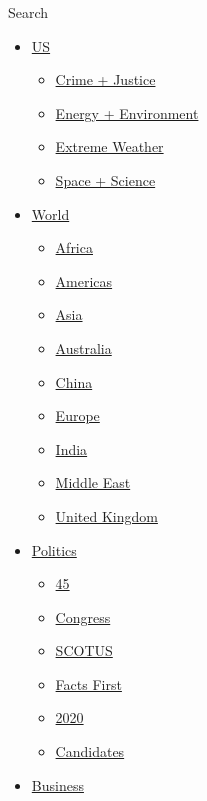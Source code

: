Search

\begin{itemize}
\tightlist
\item
  \href{/us}{US}

  \begin{itemize}
  \tightlist
  \item
    \href{/specials/us/crime-and-justice}{Crime + Justice}
  \item
    \href{/specials/us/energy-and-environment}{Energy + Environment}
  \item
    \href{/specials/us/extreme-weather}{Extreme Weather}
  \item
    \href{/specials/space-science}{Space + Science}
  \end{itemize}
\item
  \href{/world}{World}

  \begin{itemize}
  \tightlist
  \item
    \href{/africa}{Africa}
  \item
    \href{/americas}{Americas}
  \item
    \href{/asia}{Asia}
  \item
    \href{/australia}{Australia}
  \item
    \href{/china}{China}
  \item
    \href{/europe}{Europe}
  \item
    \href{/india}{India}
  \item
    \href{/middle-east}{Middle East}
  \item
    \href{/uk}{United Kingdom}
  \end{itemize}
\item
  \href{/politics}{Politics}

  \begin{itemize}
  \tightlist
  \item
    \href{/specials/politics/president-donald-trump-45}{45}
  \item
    \href{/specials/politics/congress-capitol-hill}{Congress}
  \item
    \href{/specials/politics/supreme-court-nine}{SCOTUS}
  \item
    \href{/specials/politics/fact-check-politics}{Facts First}
  \item
    \href{/specials/politics/2020-election-coverage}{2020}
  \item
    \href{/election/2020/candidates}{Candidates}
  \end{itemize}
\item
  \href{/business}{Business}


\end{itemize}
